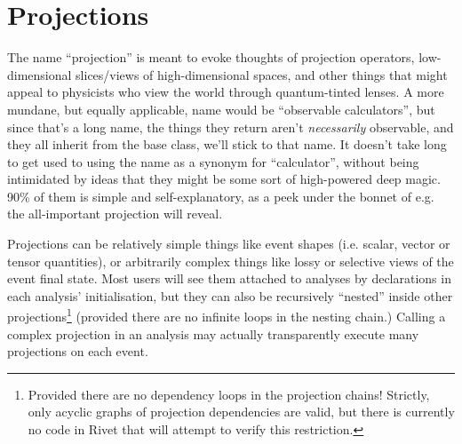 

\section{Projections}

The name ``projection'' is meant to evoke thoughts of projection operators,
low-dimensional slices/views of high-dimensional spaces, and other things that
might appeal to physicists who view the world through quantum-tinted lenses. A
more mundane, but equally applicable, name would be ``observable calculators'',
but since that's a long name, the things they return aren't \emph{necessarily}
observable, and they all inherit from the  base class, we'll
stick to that name. It doesn't take long to get used to using the name as a
synonym for ``calculator'', without being intimidated by ideas that they might
be some sort of high-powered deep magic. 90\% of them is simple and
self-explanatory, as a peek under the bonnet of e.g. the all-important
 projection will reveal.

Projections can be relatively simple things like event shapes (i.e. scalar,
vector or tensor quantities), or arbitrarily complex things like lossy or
selective views of the event final state. Most users will see them attached to
analyses by declarations in each analysis' initialisation, but they can also be
recursively ``nested'' inside other projections\footnote{Provided there are no
  dependency loops in the projection chains! Strictly, only acyclic graphs of
  projection dependencies are valid, but there is currently no code in Rivet
  that will attempt to verify this restriction.} (provided there are no infinite
loops in the nesting chain.) Calling a complex projection in an analysis may
actually transparently execute many projections on each event.


